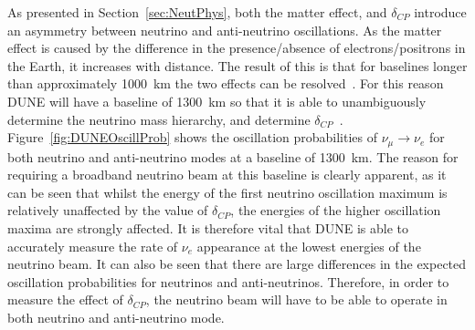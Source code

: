 As presented in Section~\ref{sec:NeutPhys}, both the matter effect, and $\delta_{CP}$ introduce an asymmetry between neutrino and anti-neutrino oscillations. As the matter effect is caused by the difference in the presence/absence of electrons/positrons in the Earth, it increases with distance. The result of this is that for baselines longer than approximately 1000~km the two effects can be resolved~\citep{Bass:2013vcg}. For this reason DUNE will have a baseline of 1300~km so that it is able to unambiguously determine the neutrino mass hierarchy, and determine $\delta_{CP}$~\citep{Diwan:2004bt}. \\

Figure~\ref{fig:DUNEOscillProb} shows the oscillation probabilities of $\nu_{\mu} \rightarrow \nu_{e}$ for both neutrino and anti-neutrino modes at a baseline of 1300~km. The reason for requiring a broadband neutrino beam at this baseline is clearly apparent, as it can be seen that whilst the energy of the first neutrino oscillation maximum is relatively unaffected by the value of $\delta_{CP}$, the energies of the higher oscillation maxima are strongly affected. It is therefore vital that DUNE is able to accurately measure the rate of $\nu_e$ appearance at the lowest energies of the neutrino beam. It can also be seen that there are large differences in the expected oscillation probabilities for neutrinos and anti-neutrinos. Therefore, in order to measure the effect of $\delta_{CP}$, the neutrino beam will have to be able to operate in both neutrino and anti-neutrino mode. \\

